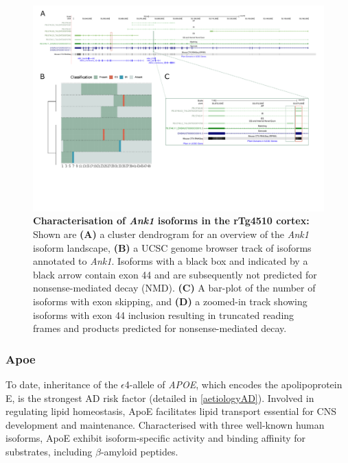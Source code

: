 \begin{landscape}
	\begin{figure}[htp]
		\centering
		\captionsetup{width=1.3\textwidth}
		\includegraphics[page=3,trim={0 1.5cm 0 0},scale = 0.85]{Figures/TargetGenes_Annotation_Landscape.pdf}
		\caption[Characterisation of \textit{Ank1} isoforms in the rTg4510 cortex]%
		{\textbf{Characterisation of \textit{Ank1} isoforms in the rTg4510 cortex:} Shown are \textbf{(A)} a cluster dendrogram for an overview of the \textit{Ank1} isoform landscape, \textbf{(B)} a UCSC genome browser track of isoforms annotated to \textit{Ank1}. Isoforms with a black box and indicated by a black arrow contain exon 44 and are subsequently not predicted for nonsense-mediated decay (NMD). \textbf{(C)} A bar-plot of the number of isoforms with exon skipping, and \textbf{(D)} a zoomed-in track showing isoforms with exon 44 inclusion resulting in truncated reading frames and products predicted for nonsense-mediated decay. }    
		\label{fig:ank1}
	\end{figure}
\end{landscape}
\restoregeometry

\newpage
\subsubsection{Apoe}
\label{ch6: apoe}
To date, inheritance of the $\epsilon$4-allele of \textit{APOE}, which encodes the apolipoprotein E, is the strongest AD risk factor (detailed in \cref{aetiologyAD}). Involved in regulating lipid homeostasis, ApoE facilitates lipid transport essential for CNS development and maintenance. Characterised with three well-known human isoforms, ApoE exhibit isoform-specific activity and binding affinity for substrates, including $\beta$-amyloid peptides\cite{Jablonski2021}. 

